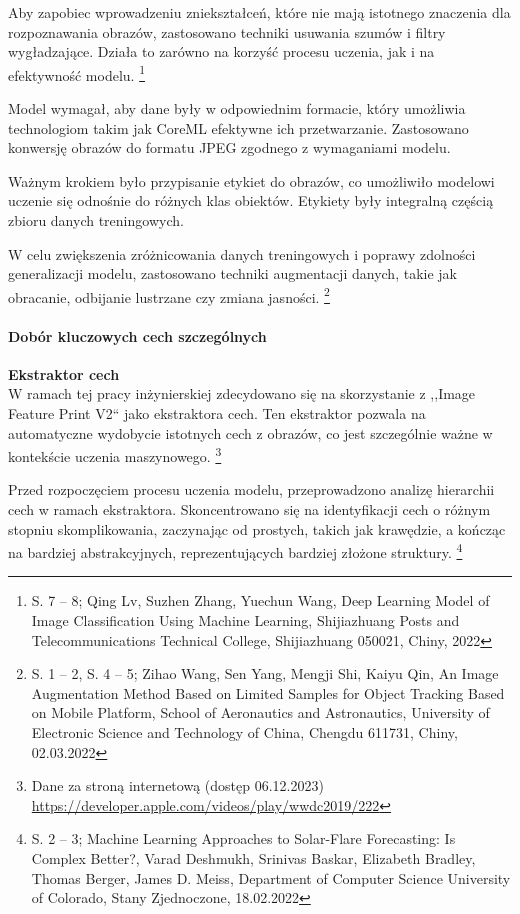 \documentclass[12pt, a4paper, twoside, openany]{book}
\newcommand{\forceindent}{\leavevmode{\parindent=1.3em\indent}}
\begin{document}
{%
Aby zapobiec wprowadzeniu zniekształceń, które nie mają istotnego znaczenia dla rozpoznawania obrazów, zastosowano techniki usuwania szumów i filtry wygładzające.
Działa to zarówno na korzyść procesu uczenia, jak i na efektywność modelu. \footnote{S. 7 -- 8; Qing Lv, Suzhen Zhang, Yuechun Wang, Deep Learning Model of Image Classification Using
    Machine Learning, Shijiazhuang Posts and Telecommunications Technical College, Shijiazhuang 050021, Chiny, 2022}

Model wymagał, aby dane były w odpowiednim formacie, który umożliwia technologiom takim jak CoreML efektywne ich przetwarzanie.
Zastosowano konwersję obrazów do formatu JPEG zgodnego z wymaganiami modelu.

Ważnym krokiem było przypisanie etykiet do obrazów, co umożliwiło modelowi uczenie się odnośnie do różnych klas obiektów.
Etykiety były integralną częścią zbioru danych treningowych.

W celu zwiększenia zróżnicowania danych treningowych i poprawy zdolności generalizacji modelu, zastosowano techniki augmentacji danych, takie jak obracanie, odbijanie lustrzane czy zmiana jasności. \footnote{ S. 1 -- 2, S. 4 -- 5; Zihao Wang, Sen Yang, Mengji Shi, Kaiyu Qin, An Image Augmentation Method Based on Limited Samples for Object Tracking Based on Mobile Platform, School of Aeronautics and Astronautics, University of Electronic Science and Technology of China, Chengdu 611731, Chiny, 02.03.2022 }

\paragraph{Dobór kluczowych cech szczególnych\\}
\forceindent \textbf{ Ekstraktor cech\\}
\indent W ramach tej pracy inżynierskiej zdecydowano się na skorzystanie z ,,Image Feature Print V2`` jako ekstraktora cech.
Ten ekstraktor pozwala na automatyczne wydobycie istotnych cech z obrazów, co jest szczególnie ważne w kontekście uczenia maszynowego. \footnote{Dane za stroną internetową (dostęp 06.12.2023) \url{https://developer.apple.com/videos/play/wwdc2019/222}}

Przed rozpoczęciem procesu uczenia modelu, przeprowadzono analizę hierarchii cech w ramach ekstraktora.
Skoncentrowano się na identyfikacji cech o różnym stopniu skomplikowania, zaczynając od prostych, takich jak krawędzie, a kończąc na bardziej abstrakcyjnych, reprezentujących bardziej złożone struktury. \footnote{ S. 2 -- 3; Machine Learning Approaches to Solar-Flare Forecasting: Is Complex Better?, Varad Deshmukh, Srinivas Baskar, Elizabeth Bradley, Thomas Berger, James D. Meiss, Department of Computer Science University of Colorado, Stany Zjednoczone, 18.02.2022}

}
\end{document}
